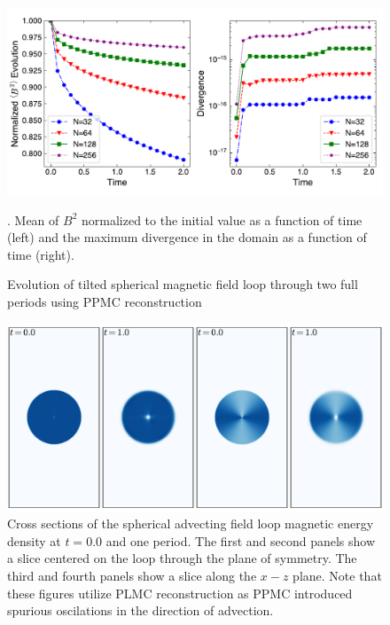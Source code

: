 \documentclass[modern, linenumbers]{aastex631}
\newcommand*{\img}[1]{%
    \raisebox{-.05\baselineskip}{%
        \texttt{[image: \#1]}%
    }%
}
\begin{document}
\begin{figure}[ht!]
    \includegraphics[width=\linewidth]{afl.pdf}
    \caption{Evolution of tilted spherical magnetic field loop through two full periods using PPMC reconstruction}. Mean of $B^2$ normalized to the initial value as a function of time (left) and the maximum divergence in the domain as a function of time (right). \href{https://zenodo.org/records/10927223}{\img{zenodo-gradient-200.png}}
    \label{fig:afl}
\end{figure}

\begin{figure}[ht!]
    \includegraphics[width=\linewidth]{afl_slices.pdf}
    \caption{Cross sections of the spherical advecting field loop magnetic energy density at $t=0.0$ and one period. The first and second panels show a slice centered on the loop through the plane of symmetry. The third and fourth panels show a slice along the $x-z$ plane. Note that these figures utilize PLMC reconstruction as PPMC introduced spurious oscilations in the direction of advection. \href{https://zenodo.org/records/10927223}{\img{zenodo-gradient-200.png}}}
    \label{fig:afl_slice}
\end{figure}
\end{document}
